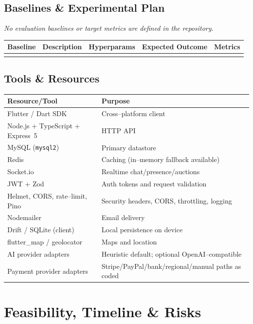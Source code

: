 \documentclass[11pt,a4paper]{article}
\begin{document}
\subsection{Baselines \& Experimental Plan}

\textit{No evaluation baselines or target metrics are defined in the repository.}

\begin{tabularx}{\textwidth}{@{}*{5}{>{\raggedright\arraybackslash}X}@{}}
\toprule
\textbf{Baseline} & \textbf{Description} & \textbf{Hyperparams} & \textbf{Expected Outcome} & \textbf{Metrics} \\
\midrule
 &  &  &  &  \\
\bottomrule
\end{tabularx}

\subsection{Tools \& Resources}

\begin{tabularx}{\textwidth}{@{}>{\raggedright\arraybackslash}p{5cm}X@{}}
\toprule
\textbf{Resource/Tool} & \textbf{Purpose} \\
\midrule
Flutter / Dart SDK & Cross--platform client \\
Node.js + TypeScript + Express~5 & HTTP API \\
MySQL (\texttt{mysql2}) & Primary datastore \\
Redis & Caching (in--memory fallback available) \\
Socket.io & Realtime chat/presence/auctions \\
JWT + Zod & Auth tokens and request validation \\
Helmet, CORS, rate--limit, Pino & Security headers, CORS, throttling, logging \\
Nodemailer & Email delivery \\
Drift / SQLite (client) & Local persistence on device \\
flutter\_map / geolocator & Maps and location \\
AI provider adapters & Heuristic default; optional OpenAI--compatible \\
Payment provider adapters & Stripe/PayPal/bank/regional/manual paths as coded \\
\bottomrule
\end{tabularx}

\section{Feasibility, Timeline \& Risks}
\end{document}
